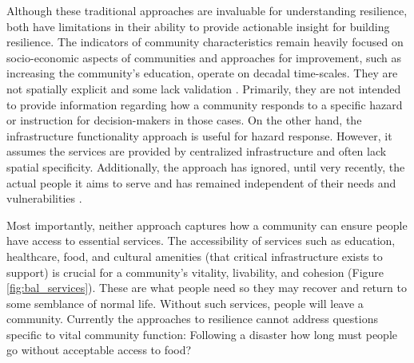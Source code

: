 \documentclass[onecolumn,doublespacing]{risa}
\let \cite \parencite
\begin{document}
Although these traditional approaches are invaluable for understanding resilience, both have limitations in their ability to provide actionable insight for building resilience.
The indicators of community characteristics remain heavily focused on socio-economic aspects of communities \cite{Koliou2018-jt} and approaches for improvement, such as increasing the community's education, operate on decadal time-scales.
They are not spatially explicit and some lack validation \cite{Bakkensen2016-ht}.
Primarily, they are not intended to provide information regarding how a community responds to a specific hazard or instruction for decision-makers in those cases.
On the other hand, the infrastructure functionality approach is useful for hazard response.
However, it assumes the services are provided by centralized infrastructure and often lack spatial specificity. 
Additionally, the approach has ignored, until very recently, the actual people it aims to serve and has remained independent of their needs and vulnerabilities \cite{Cutter2008-placeBasedModel, Cutter2010-vg, Doorn2018-fx}.

Most importantly, neither approach captures how a community can ensure people have access to essential services. 
The accessibility of services such as education, healthcare, food, and cultural amenities (that critical infrastructure exists to support) is crucial for a community’s vitality, livability, and cohesion \cite{Dempsey2011-og, Talen2003-dc, Winter1997-kc, United_Nations_Educational_Scientific_and_Cultural_Organization2018-sf} (Figure \ref{fig:bal_services}).  
These are what people need so they may recover and return to some semblance of normal life. 
Without such services, people will leave a community.
Currently the approaches to resilience cannot address questions specific to vital community function:
Following a disaster how long must people go without acceptable access to food?
\end{document}
